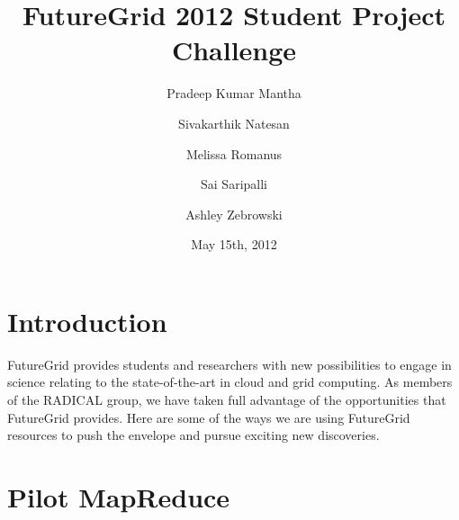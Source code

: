 \documentclass[]{paper}
\begin{document}
\title{FutureGrid 2012 Student Project Challenge} 
\author{Pradeep Kumar Mantha 
  \and Sivakarthik Natesan 
  \and Melissa Romanus 
  \and Sai Saripalli 
  \and Ashley Zebrowski
}
\date{May 15th, 2012}
\maketitle

\begin{abstract}
\end{abstract}

\section{Introduction}
FutureGrid provides students and researchers with new possibilities to
engage in science relating to the state-of-the-art in cloud and grid computing.
As members of the RADICAL group, we have taken full advantage
of the opportunities that FutureGrid provides.  Here are some of the ways
we are using FutureGrid resources to push the envelope and pursue exciting
new discoveries.
\section{Pilot MapReduce}
\end{document}
